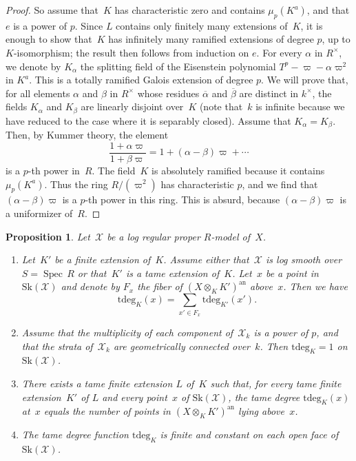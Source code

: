 \documentclass[11pt]{article}
\newtheorem{prop}[equation]{Proposition}
\theoremstyle{definition}
\numberwithin{equation}{subsection}
\newcommand{\cX}{\ensuremath{\mathscr{X}}}
\newcommand{\an}{\mathrm{an}}
\newcommand{\Sk}{\mathrm{Sk}}
\newcommand{\tdeg}{\mathrm{tdeg}}
\DeclareMathOperator{\Spec}{Spec}
\let\unif\varpi
\begin{document}
\begin{proof}
So assume that~$K$ has characteristic zero and contains $\mu_p(K^a)$, and that $e$ is a power of $p$. Since $L$ contains only finitely many extensions of~$K$, it is enough to show that~$K$ has infinitely many ramified extensions of degree $p$, up to $K$\nobreakdash-isomorphism; the result then follows from induction on $e$. For every $\alpha$ in $R^{\times}$, we denote by $K_\alpha$ the splitting field of the Eisenstein polynomial $T^p-\unif-\alpha\unif^2$ in $K^a$. This is a totally ramified Galois extension of degree $p$.
We will prove that, for all elements $\alpha$ and $\beta$ in $R^{\times}$ whose residues $\overline{\alpha}$ and $\overline{\beta}$ are distinct in $k^{\times}$, the fields $K_\alpha$ and $K_\beta$ are linearly disjoint over~$K$ (note that~$k$ is infinite because we have reduced to the case where it is separably closed). Assume that $K_\alpha=K_\beta$.
Then, by Kummer theory, the element
\[
\frac{1+\alpha\unif}{1+\beta\unif}=1+(\alpha-\beta)\unif + \cdots
\]
is a $p$-th power in~$R$. The field~$K$ is absolutely ramified because it contains $\mu_p(K^a)$. Thus the ring $R/(\unif^2)$ has characteristic $p$, and we find that $(\alpha-\beta)\unif$ is a $p$-th power in this ring. This is absurd, because $(\alpha-\beta)\unif$ is a uniformizer of~$R$.
\end{proof}

\begin{prop}\label{prop:tamedeg}
Let~$\cX$ be a log regular proper $R$\nobreakdash-model of~$X$.
\begin{enumerate}
\item \label{it:fib} Let~$K'$ be a finite extension of~$K$. Assume either that~$\cX$ is log smooth over $S=\Spec\,R$ or that~$K'$ is a tame extension of~$K$. Let~$x$ be a point in $\Sk(\cX)$ and denote by $F_x$ the fiber of $(X\otimes_K K')^{\an}$ above~$x$. Then we have
\[
\tdeg_K(x)=\sum_{x'\in F_x}\tdeg_{K'}(x').
\]
\item \label{it:one} Assume that the multiplicity of each component of~$\cX_k$ is a power of $p$, and that the strata of~$\cX_k$ are geometrically connected over~$k$. Then $\tdeg_K=1$ on $\Sk(\cX)$.
\item \label{it:split} There exists a tame finite extension $L$ of~$K$ such that, for
every tame finite extension~$K'$ of $L$ and every point~$x$ of $\Sk(\cX)$, the tame degree $\tdeg_K(x)$ at~$x$ equals the number of points in $(X\otimes_K K')^{\an}$ lying above~$x$.
\item \label{it:const} The tame degree function $\tdeg_K$ is finite and constant on each open face of
$\Sk(\cX)$.
\end{enumerate}
\end{prop}
\end{document}
